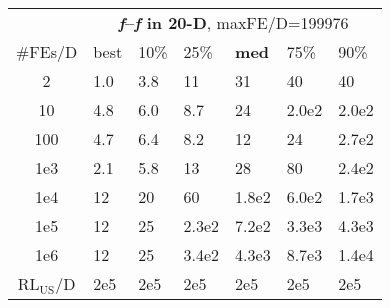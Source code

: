 \begin{tabular}{c|llllll}
 & \multicolumn{6}{|c}{\textbf{\textit{f}\raisebox{-0.35ex}{1}--\textit{f}\raisebox{-0.35ex}{24} in 20-D}, maxFE/D=199976}\\
\#FEs/D & best & 10\% & 25\% & \textbf{med} & 75\% & 90\%\\
2 & \hspace*{1ex}1.0 & \hspace*{1ex}3.8 & 11 & 31 & 40 & 40\\
10 & \hspace*{1ex}4.8 & \hspace*{1ex}6.0 & \hspace*{1ex}8.7 & 24 & 2.0e2 & 2.0e2\\
100 & \hspace*{1ex}4.7 & \hspace*{1ex}6.4 & \hspace*{1ex}8.2 & 12 & 24 & 2.7e2\\
1e3 & \hspace*{1ex}2.1 & \hspace*{1ex}5.8 & 13 & 28 & 80 & 2.4e2\\
1e4 & 12 & 20 & 60 & 1.8e2 & 6.0e2 & 1.7e3\\
1e5 & 12 & 25 & 2.3e2 & 7.2e2 & 3.3e3 & 4.3e3\\
1e6 & 12 & 25 & 3.4e2 & 4.3e3 & 8.7e3 & 1.4e4\\
$\text{RL}_{\text{US}}$/D & 2e5 & 2e5 & 2e5 & 2e5 & 2e5 & 2e5
\end{tabular}
